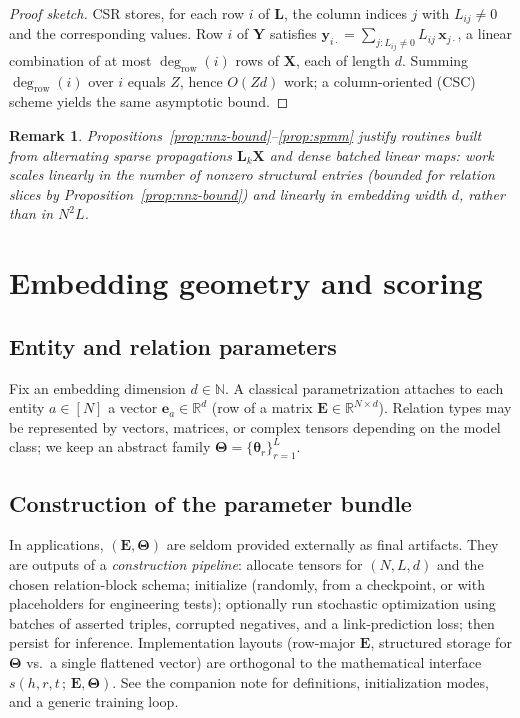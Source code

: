 \documentclass[11pt]{article}
\newtheorem{remark}{Remark}
\begin{document}
\begin{proof}[Proof sketch]
CSR stores, for each row $i$ of $\bm{L}$, the column indices $j$ with $L_{ij}\neq 0$ and the corresponding values.
Row $i$ of $\bm{Y}$ satisfies $\bm{y}_{i\cdot} = \sum_{j : L_{ij}\neq 0} L_{ij}\,\bm{x}_{j\cdot}$, a linear combination of at most $\deg_{\mathrm{row}}(i)$ rows of $\bm{X}$, each of length $d$.
Summing $\deg_{\mathrm{row}}(i)$ over $i$ equals $Z$, hence $O(Zd)$ work; a column-oriented \textup{(CSC)} scheme yields the same asymptotic bound.
\end{proof}

\begin{remark}
Propositions~\ref{prop:nnz-bound}--\ref{prop:spmm} justify routines built from alternating sparse propagations $\bm{L}_k\bm{X}$ and dense batched linear maps: work scales linearly in the number of nonzero structural entries \textup{(}bounded for relation slices by Proposition~\ref{prop:nnz-bound}\textup{)} and linearly in embedding width $d$, rather than in $N^2L$.
\end{remark}

\section{Embedding geometry and scoring}

\subsection{Entity and relation parameters}
Fix an embedding dimension $d \in \mathbb{N}$.
A classical parametrization attaches to each entity $a \in [N]$ a vector $\bm{e}_a \in \mathbb{R}^d$ (row of a matrix $\bm{E} \in \mathbb{R}^{N \times d}$).
Relation types may be represented by vectors, matrices, or complex tensors depending on the model class; we keep an abstract family $\bm{\Theta} = \{ \bm{\theta}_r \}_{r=1}^{L}$.

\subsection{Construction of the parameter bundle}
In applications, $(\bm{E}, \bm{\Theta})$ are seldom provided externally as final artifacts.
They are outputs of a \emph{construction pipeline}: allocate tensors for $(N, L, d)$ and the chosen relation-block schema; initialize (randomly, from a checkpoint, or with placeholders for engineering tests); optionally run stochastic optimization using batches of asserted triples, corrupted negatives, and a link-prediction loss; then persist for inference.
Implementation layouts (row-major $\bm{E}$, structured storage for $\bm{\Theta}$ vs.\ a single flattened vector) are orthogonal to the mathematical interface $s(h,r,t\,;\,\bm{E},\bm{\Theta})$.
See the companion note \cite{ConstructionCompanion} for definitions, initialization modes, and a generic training loop.
\end{document}
